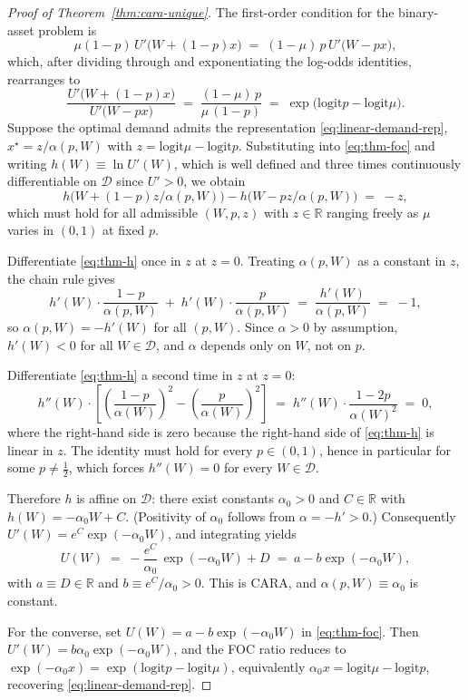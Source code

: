 \documentclass[12pt,letterpaper]{article}
\theoremstyle{definition}
\theoremstyle{remark}
\newcommand{\R}{\mathbb{R}}
\newcommand{\logit}{\mathrm{logit}}
\newcommand{\1}{\mathbf{1}}
\begin{document}
\begin{proof}[Proof of Theorem~\ref{thm:cara-unique}]
The first-order condition for the binary-asset problem is
\[
   \mu(1-p)\,U'\!\bigl(W+(1-p)x\bigr) \;=\; (1-\mu)\,p\,U'\!\bigl(W-px\bigr),
\]
which, after dividing through and exponentiating the log-odds identities,
rearranges to
\begin{equation}
   \frac{U'\!\bigl(W+(1-p)x\bigr)}{U'\!\bigl(W-px\bigr)}
   \;=\; \frac{(1-\mu)\,p}{\mu\,(1-p)}
   \;=\; \exp\!\bigl(\logit p - \logit\mu\bigr).
\label{eq:thm-foc}
\end{equation}
Suppose the optimal demand admits the representation
\eqref{eq:linear-demand-rep}, $x^{\star}=z/\alpha(p,W)$ with
$z=\logit\mu-\logit p$. Substituting into \eqref{eq:thm-foc} and writing
$h(W)\equiv\ln U'(W)$, which is well defined and three times continuously
differentiable on $\mathcal{D}$ since $U'>0$, we obtain
\begin{equation}
   h\!\bigl(W+(1-p)z/\alpha(p,W)\bigr) - h\!\bigl(W-pz/\alpha(p,W)\bigr) \;=\; -z,
\label{eq:thm-h}
\end{equation}
which must hold for all admissible $(W,p,z)$ with $z\in\R$ ranging freely
as $\mu$ varies in $(0,1)$ at fixed $p$.

Differentiate \eqref{eq:thm-h} once in $z$ at $z=0$. Treating
$\alpha(p,W)$ as a constant in $z$, the chain rule gives
\[
   h'(W)\cdot\frac{1-p}{\alpha(p,W)}
   \;+\; h'(W)\cdot\frac{p}{\alpha(p,W)}
   \;=\; \frac{h'(W)}{\alpha(p,W)} \;=\; -1,
\]
so $\alpha(p,W)=-h'(W)$ for all $(p,W)$. Since $\alpha>0$ by assumption,
$h'(W)<0$ for all $W\in\mathcal{D}$, and $\alpha$ depends only on $W$,
not on $p$.

Differentiate \eqref{eq:thm-h} a second time in $z$ at $z=0$:
\[
   h''(W)\cdot\!\left[\!\left(\frac{1-p}{\alpha(W)}\right)^{\!2}
   - \left(\frac{p}{\alpha(W)}\right)^{\!2}\right]
   \;=\; h''(W)\cdot\frac{1-2p}{\alpha(W)^{2}} \;=\; 0,
\]
where the right-hand side is zero because the right-hand side of
\eqref{eq:thm-h} is linear in $z$. The identity must hold for every
$p\in(0,1)$, hence in particular for some $p\neq\tfrac12$, which forces
$h''(W)=0$ for every $W\in\mathcal{D}$.

Therefore $h$ is affine on $\mathcal{D}$: there exist constants
$\alpha_{0}>0$ and $C\in\R$ with $h(W)=-\alpha_{0}W+C$. (Positivity of
$\alpha_{0}$ follows from $\alpha=-h'>0$.) Consequently
$U'(W)=e^{C}\exp(-\alpha_{0}W)$, and integrating yields
\[
   U(W) \;=\; -\frac{e^{C}}{\alpha_{0}}\,\exp(-\alpha_{0}W) + D
   \;=\; a - b\exp(-\alpha_{0}W),
\]
with $a\equiv D\in\R$ and $b\equiv e^{C}/\alpha_{0}>0$. This is CARA, and
$\alpha(p,W)\equiv\alpha_{0}$ is constant.

For the converse, set $U(W)=a-b\exp(-\alpha_{0}W)$ in \eqref{eq:thm-foc}.
Then $U'(W)=b\alpha_{0}\exp(-\alpha_{0}W)$, and the FOC ratio reduces to
$\exp(-\alpha_{0}x)=\exp(\logit p - \logit\mu)$, equivalently
$\alpha_{0}x=\logit\mu-\logit p$, recovering
\eqref{eq:linear-demand-rep}.
\end{proof}
\end{document}
